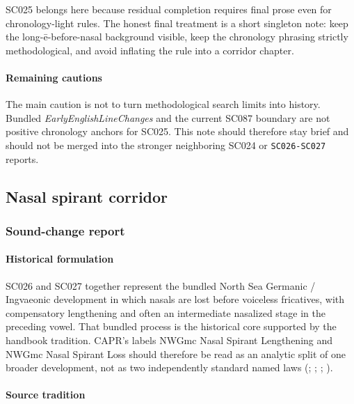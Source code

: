 \documentclass[
  british,
  a4paper,
]{article}
\begin{document}
SC025 belongs here because residual completion requires final prose even
for chronology-light rules. The honest final treatment is a short
singleton note: keep the long-ē-before-nasal background visible, keep
the chronology phrasing strictly methodological, and avoid inflating the
rule into a corridor chapter.

\paragraph{Remaining cautions}\label{remaining-cautions-18}

The main caution is not to turn methodological search limits into
history. Bundled \emph{EarlyEnglishLineChanges} and the current SC087
boundary are not positive chronology anchors for SC025. This note should
therefore stay brief and should not be merged into the stronger
neighboring SC024 or \texttt{SC026-SC027} reports.

\subsection{Nasal spirant corridor}\label{nasal-spirant-corridor}

\subsubsection{Sound-change report}\label{sound-change-report-19}

\paragraph{Historical formulation}\label{historical-formulation-19}

SC026 and SC027 together represent the bundled North Sea Germanic /
Ingvaeonic development in which nasals are lost before voiceless
fricatives, with compensatory lengthening and often an intermediate
nasalized stage in the preceding vowel. That bundled process is the
historical core supported by the handbook tradition. CAPR's labels NWGmc
Nasal Spirant Lengthening and NWGmc Nasal Spirant Loss should therefore
be read as an analytic split of one broader development, not as two
independently standard named laws (; ;
;
).

\paragraph{Source tradition}\label{source-tradition-19}
\end{document}
